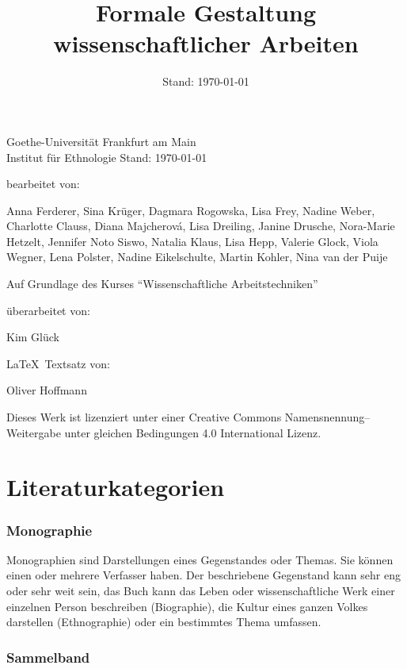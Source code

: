 \documentclass[ 12pt,
                titlepage,
                parskip=half,
                version=first,
                bibliography=totocnumbered,
                final,
                listof=totoc]{scrartcl}
\title{Formale Gestaltung wissenschaftlicher Arbeiten}
\date{Stand: \today}
\begin{document}
\maketitle

Goethe-Universität Frankfurt am Main\\
Institut für Ethnologie
\vfill
Stand: \today

bearbeitet von:

Anna Ferderer, Sina Krüger, Dagmara Rogowska, Lisa Frey, Nadine Weber, Charlotte
Clauss, Diana Majcherová, Lisa Dreiling, Janine Drusche, Nora-Marie Hetzelt,
Jennifer Noto Siswo, Natalia Klaus, Lisa Hepp, Valerie Glock, Viola Wegner, Lena
Polster, Nadine Eikelschulte, Martin Kohler, Nina van der Puije

Auf Grundlage des Kurses \enquote{Wissenschaftliche Arbeitstechniken}

überarbeitet von:

Kim Glück

\LaTeX~Textsatz von:

Oliver Hoffmann
\vfill
\begin{center}
\ccbysa

Dieses Werk ist lizenziert unter einer Creative Commons Namensnennung--
Weitergabe unter gleichen Bedingungen 4.0 International Lizenz.
\end{center}

\newpage
{}
\tableofcontents
{}
\newpage

\section{Literaturkategorien}
\label{sec:literaturkategorien}

\subsubsection*{Monographie}

Monographien sind Darstellungen eines Gegenstandes oder Themas. Sie können einen
oder mehrere Verfasser haben. Der beschriebene Gegenstand kann sehr eng oder
sehr weit sein, das Buch kann das Leben oder wissenschaftliche Werk einer
einzelnen Person beschreiben (Biographie), die Kultur eines ganzen Volkes
darstellen (Ethnographie) oder ein bestimmtes Thema umfassen.

\subsubsection*{Sammelband}
\end{document}
